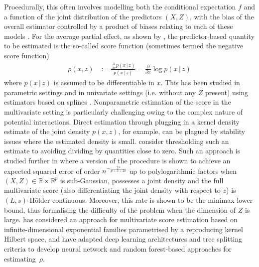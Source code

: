 \documentclass[aos]{imsart}
\newcommand{\R}{\mathbb{R}}
\newcommand{\given}{\,|\,}
\begin{document}
	Procedurally, this often involves modelling both the conditional expectation $f$ and a function of the joint distribution of the predictors $(X, Z)$, with the bias of the overall estimator controlled by a product of biases relating to each of these models \citep{rotnitzky2021characterization}. 
	For the average partial effect, as shown by \citet{PowellIndex,NeweyEfficiency}, the predictor-based quantity to be estimated is the so-called score function (sometimes termed the negative score function)
	\begin{align*}
		\rho(x,z)&:= \frac{\frac{\partial}{\partial x} p(x\given  z) }{p(x\given  z)} = \frac{\partial}{\partial x} \log p(x \given z) %
	\end{align*}
	where $p(x \given z)$ is assumed to be differentiable in $x$. This has been studied in parametric settings \citep{StokerIndex} and in univariate settings (i.e. without any $Z$ present)  using estimators based on splines \citep{CoxSpline, NgSpline, BeraScore}. Nonparametric estimation of the score in the multivariate setting  is particularly challenging owing to the complex nature of potential interactions. Direct estimation through plugging in a kernel density estimate of the joint density $p(x, z)$, for example, can be plagued by stability issues where the estimated density is small. \citet{HardleAverageDerivative} consider thresholding such an estimate to avoiding dividing by quantities close to zero. Such an approach is studied further in \citet{wibisono2024optimal} where a version of the procedure is shown to achieve an expected squared error of order $n^{-\frac{2s}{p+3+2s}}$ up to polylogarithmic factors when $(X, Z) \in \R \times \R^p$ is sub-Gaussian, possesses a joint density and the full multivariate score (also differentiating the joint density with respect to $z$) is $(L, s)$-H\"older continuous.  Moreover, this rate is shown to be the minimax lower bound, thus formalising the difficulty of the problem when the dimension of $Z$ is large.
	 \citet{SriperumbudurInfinite} has considered an approach for multivariate score estimation based on infinite-dimensional exponential families parametrised by a reproducing kernel Hilbert space, and  %
	\citet{chernozhukov2020adversarial,ChernozhukovRieszNet} have adapted deep learning architectures and tree splitting criteria to develop neural network and random forest-based approaches for estimating~$\rho$.
	
\end{document}
